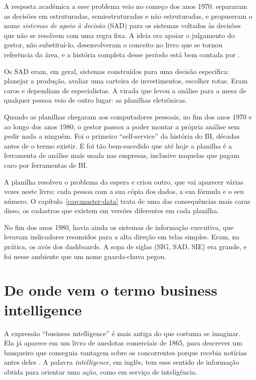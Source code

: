 A resposta acadêmica a esse problema veio no começo dos anos 1970. \textcite{gorry1971}
separaram as decisões em estruturadas, semiestruturadas e não estruturadas, e propuseram
o nome \emph{sistemas de apoio à decisão} (SAD) para os sistemas voltados às decisões
que não se resolvem com uma regra fixa. A ideia era apoiar o julgamento do gestor, não
substituí-lo. \textcite{keen1978} desenvolveram o conceito no livro que se tornou
referência da área, e a história completa desse período está bem contada por
\textcite{power2007}.

Os SAD eram, em geral, sistemas construídos para uma decisão específica: planejar a
produção, avaliar uma carteira de investimentos, escolher rotas. Eram caros e dependiam
de especialistas. A virada que levou a análise para a mesa de qualquer pessoa veio de
outro lugar: as planilhas eletrônicas.

Quando as planilhas chegaram aos computadores pessoais, no fim dos anos 1970 e ao longo
dos anos 1980, o gestor passou a poder montar a própria análise sem pedir nada a
ninguém. Foi o primeiro \enquote{self-service} da história do BI, décadas antes de o
termo existir. E foi tão bem-sucedido que até hoje a planilha é a ferramenta de análise
mais usada nas empresas, inclusive naquelas que pagam caro por ferramentas de BI.

A planilha resolveu o problema da espera e criou outro, que vai aparecer várias vezes
neste livro: cada pessoa com a sua cópia dos dados, a sua fórmula e o seu número. O
capítulo~\ref{cap:master-data} trata de uma das consequências mais caras disso, os
cadastros que existem em versões diferentes em cada planilha.

No fim dos anos 1980, havia ainda os sistemas de informação executiva, que levavam
indicadores resumidos para a alta direção em telas simples. Eram, na prática, os avós
dos dashboards. A sopa de siglas (SIG, SAD, SIE) era grande, e foi nesse ambiente que
um nome guarda-chuva pegou.


\section{De onde vem o termo business intelligence}
\label{sec:termo-bi}

A expressão \enquote{business intelligence} é mais antiga do que costuma se imaginar.
Ela já aparece em um livro de anedotas comerciais de 1865, para descrever um banqueiro
que conseguia vantagem sobre os concorrentes porque recebia notícias antes deles
\parencite{devens1865}. A palavra \emph{intelligence}, em inglês, tem esse sentido de
informação obtida para orientar uma ação, como em serviço de inteligência.


